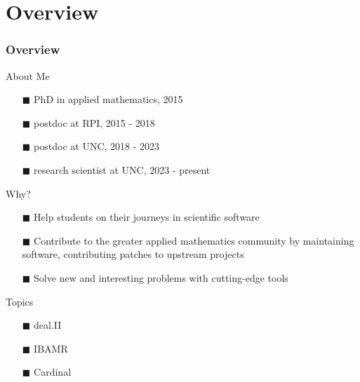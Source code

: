 \documentclass[8pt]{beamer}
\begin{document}




\section{Overview}
\begin{frame}
    \frametitle{Overview}
    {\large About Me}
    \begin{itemize}
    \item[$\blacksquare$] PhD in applied mathematics, 2015
    \item[$\blacksquare$] postdoc at RPI, 2015 - 2018
    \item[$\blacksquare$] postdoc at UNC, 2018 - 2023
    \item[$\blacksquare$] research scientist at UNC, 2023 - present
    \end{itemize}

    \vfill

    {\large Why?}
    \begin{itemize}
    \item[$\blacksquare$] Help students on their journeys in scientific software
    \item[$\blacksquare$] Contribute to the greater applied mathematics community
      by maintaining software, contributing patches to upstream projects
    \item[$\blacksquare$] Solve new and interesting problems with cutting-edge tools
    \end{itemize}

    \vfill

    {\large Topics}
    \begin{itemize}
    \item[$\blacksquare$] deal.II
    \item[$\blacksquare$] IBAMR
    \item[$\blacksquare$] Cardinal
    \end{itemize}
\end{frame}
\end{document}
